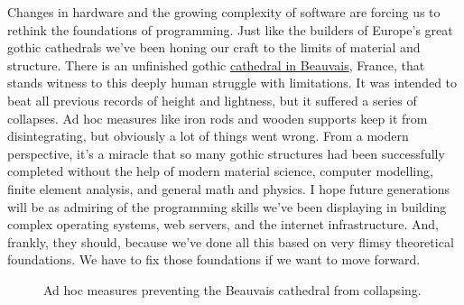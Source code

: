 Changes in hardware and the growing complexity of software are forcing
us to rethink the foundations of programming. Just like the builders of
Europe's great gothic cathedrals we've been honing our craft to the
limits of material and structure. There is an unfinished gothic
\href{http://en.wikipedia.org/wiki/Beauvais_Cathedral}{cathedral in
Beauvais}, France, that stands witness to this deeply human struggle
with limitations. It was intended to beat all previous records of height
and lightness, but it suffered a series of collapses. Ad hoc measures
like iron rods and wooden supports keep it from disintegrating, but
obviously a lot of things went wrong. From a modern perspective, it's a
miracle that so many gothic structures had been successfully completed
without the help of modern material science, computer modelling, finite
element analysis, and general math and physics. I hope future
generations will be as admiring of the programming skills we've been
displaying in building complex operating systems, web servers, and the
internet infrastructure. And, frankly, they should, because we've done
all this based on very flimsy theoretical foundations. We have to fix
those foundations if we want to move forward.

\begin{figure}
\centering
{}
\caption{Ad hoc measures preventing the Beauvais cathedral from collapsing.}
\end{figure}
